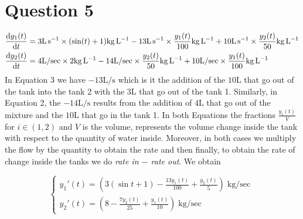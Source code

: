 \documentclass[
	12pt,
	]{article}
\theoremstyle{definition}
\theoremstyle{definition}
\theoremstyle{definition}
\theoremstyle{definition}
\theoremstyle{definition}
\theoremstyle{example}
\theoremstyle{note}
\theoremstyle{remark}
\theoremstyle{example}
\begin{document}
			\section*{Question 5} 
				\begin{align}
					\dv{y_{1}(t)}{t} &= 3 \si{\liter\per\second} \times (\sin(t) + 1) \si{\kilogram\per\liter} - 13 \si{\liter\per\second} \times \frac{y_{1}(t)}{100} \si{\kilogram\per\liter} + 10\si{\liter\per\second} \times \frac{y_{2}(t)}{50} \si{\kilogram\per\liter} \\
					\dv{y_{2}(t)}{t} &= 4\si{\liter\per\sec} \times 2\si{\kilogram\per\liter} -14 \si{\liter\per\sec}\times \frac{y_{2}(t)}{50} \si{\kilogram\per\liter} + 10\si{\liter\per\sec} \times \frac{y_{1}(t)}{100} \si{\kilogram\per\liter} 
				\end{align}
				In Equation 3 we have $-13 \si{\liter\per\second}$ which is it the addition of the $10 \si{\liter}$ that go out of the tank into the tank 2 with the $3 \si{\liter}$ that go out of the tank 1. Similarly, in Equation 2, the $-14 \si{\liter\per\second}$ results from the addition of $4 \si{\liter}$ that go out of the mixture and the $10 \si{\liter}$ that go in the tank 1. In both Equations the fractions $\frac{y_{i}(t)}{V}$ for $i\in (1,2)$ and $V$ is the volume, represents the volume change inside the tank with respect to the quantity of water inside. Moreover, in both cases  we multiply the flow by the quantity to obtain the rate and then finally, to obtain the rate of change inside the tanks we do \textit{rate in $-$ rate out}. We obtain
				
				\begin{equation}
					\begin{cases}
						y_{1}'(t) = \left(3(\sin t + 1) -\frac{13 y_{1}(t)}{100} + \frac{y_{2}(t)}{5}\right) \si{\kilogram\per\sec} \\
						y_{2}'(t) = \left(8 - \frac{7y_{2}(t)}{25} + \frac{y_{1}(t)}{10}\right) \si{\kilogram\per\sec}
					\end{cases}
				\end{equation}
				
\end{document}
